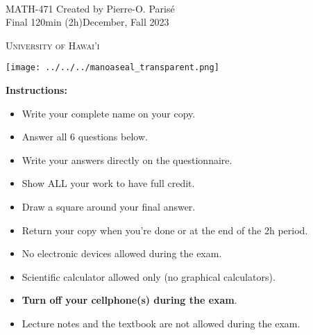 \documentclass[addpoints, 12pt]{exam}%
\theoremstyle{definition}
\begin{document}
	\noindent \hrulefill \\
	\noindent MATH-471 \hfill Created by Pierre-O. Paris{\'e}\\
	Final 120min (2h)\hfill December, Fall 2023\\\vspace*{-0.7cm}

\noindent\hrulefill

\vspace*{0.5cm}

\begin{center}
\begin{minipage}{0.6\textwidth}
\begin{Huge}
\textsc{University of Hawai'i}
\end{Huge}
\end{minipage}
\begin{minipage}{0.12\textwidth}
\texttt{[image: ../../../manoaseal\_transparent.png]}
\end{minipage}
\end{center}
	
\vspace*{0.5cm}

\noindent{}

\vspace*{0.5cm}

\noindent{}

\vspace*{1cm}

\begin{center}
\gradetable[h][questions]
\end{center}

\vspace*{1cm}

\noindent\textbf{Instructions:} 

\begin{itemize}
\item Write your complete name on your copy. 
\item Answer all 6 questions below.
\item Write your answers directly on the questionnaire.
\item Show ALL your work to have full credit.
\item Draw a square around your final answer.
\item Return your copy when you're done or at the end of the 2h period. 
\item No electronic devices allowed during the exam. 
\item Scientific calculator allowed only (no graphical calculators).
\item \textbf{Turn off your cellphone(s) during the exam}.
\item Lecture notes and the textbook are not allowed during the exam. 
\end{itemize}
\end{document}
